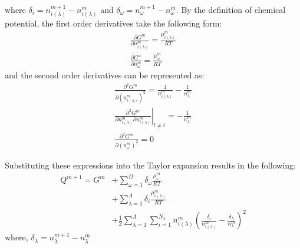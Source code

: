 	where $\delta_i  = n_{i(\lambda)}^{m+1} - n_{i(\lambda)}^m$ and $\delta_{\omega}  = n_{\omega}^{m+1} - n_{\omega}^m$. By the definition of chemical potential, the first order derivatives take the following form:
	\begin{gather}
		\frac{\partial G^m}{\partial n_{i(\lambda)}^{m}} = \frac{\mu_{i(\lambda)}^{m}}{RT} \\
		\frac{\partial G^{\omega}}{\partial n_{\omega}^{m}} = \frac{\mu_{\omega}^{m}}{RT}
	\end{gather}
	and the second order derivatives can be represented as:
	\begin{gather}
		\frac{\partial^2 G^m}{\partial \left(n_{i(\lambda)}^{m}\right)^2} = \frac{1}{n_{i(\lambda)}^{m}} - \frac{1}{n_{\lambda}^{m}}\\
		\left. \frac{\partial^2 G^m}{\partial n_{i(\lambda)}^{m} \partial n_{l(\lambda)}^{m}}\right\vert_{l\neq i} =  - \frac{1}{n_{\lambda}^{m}} \\
		\frac{\partial^2 G^m}{\partial \left(n_{\omega}^{m}\right)^2} = 0
	\end{gather}

	Substituting these expressions into the Taylor expansion results in the following:
	\begin{equation}\label{eq:Taylor_Obj}
		\begin{aligned}
		Q^{m+1} = G^m &+  \sum_{\omega=1}^{\Omega} \delta_{\omega} \frac{\mu_{\omega}^{m}}{RT}\\
				&+ \sum_{\lambda=1}^{\Lambda} \delta_{i} \frac{\mu_{i(\lambda)}^m}{RT}\\
				&+ \frac{1}{2} \sum_{\lambda=1}^{\Lambda} \sum_{i=1}^{N_{\lambda}} n_{i(\lambda)}^{m} \left(\frac{\delta_i}{n_{i(\lambda)}^{m}} - \frac{\delta_{\lambda}}{n_{\lambda}^{m}} \right)^2
		\end{aligned}
	\end{equation}
	where, $\delta_{\lambda} = n_{\lambda}^{m+1} - n_{\lambda}^m$


